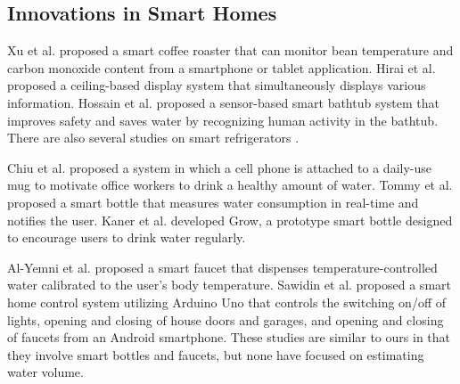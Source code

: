 \documentclass[sigconf]{acmart}
\begin{document}
\subsection{Innovations in Smart Homes}
Xu et al.\cite{smart_home1} proposed a smart coffee roaster that can monitor bean temperature and carbon monoxide content from a smartphone or tablet application.
Hirai et al.\cite{smart_home2} proposed a ceiling-based display system that simultaneously displays various information.
Hossain et al.\cite{smart_home3} proposed a sensor-based smart bathtub system that improves safety and saves water by recognizing human activity in the bathtub.
There are also several studies on smart refrigerators \cite{smart_refrigerator1, smart_refrigerator2, smart_refrigerator3, smart_refrigerator4}. \par

Chiu et al.\cite{PlayfulBottle} proposed a system in which a cell phone is attached to a daily-use mug to motivate office workers to drink a healthy amount of water.
Tommy et al.\cite{SmartBottle} proposed a smart bottle that measures water consumption in real-time and notifies the user.
Kaner et al.\cite{GROW} developed Grow, a prototype smart bottle designed to encourage users to drink water regularly.\par

Al-Yemni et al.\cite{smart_faucet2} proposed a smart faucet that dispenses temperature-controlled water calibrated to the user’s body temperature.
Sawidin et al.\cite{smart_faucet3} proposed a smart home control system utilizing Arduino Uno that controls the switching on/off of lights, opening and closing of house doors and garages, and opening and closing of faucets from an Android smartphone.
These studies are similar to ours in that they involve smart bottles and faucets, but none have focused on estimating water volume.
\end{document}
